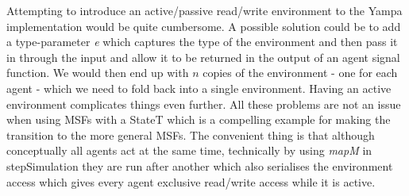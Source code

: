 Attempting to introduce an active/passive read/write environment to the Yampa implementation would be quite cumbersome. A possible solution could be to add a type-parameter \textit{e} which captures the type of the environment and then pass it in through the input and allow it to be returned in the output of an agent signal function. We would then end up with $n$ copies of the environment - one for each agent - which we need to fold back into a single environment. Having an active environment complicates things even further. All these problems are not an issue when using MSFs with a StateT which is a compelling example for making the transition to the more general MSFs. The convenient thing is that although conceptually all agents act at the same time, technically by using \textit{mapM} in stepSimulation they are run after another which also serialises the environment access which gives every agent exclusive read/write access while it is active.

